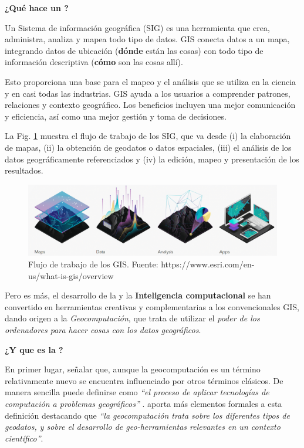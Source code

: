 \documentclass[
]{book}
\theoremstyle{definition}
\theoremstyle{definition}
\theoremstyle{definition}
\theoremstyle{definition}
\theoremstyle{remark}
\begin{document}
\textbf{¿Qué hace un ?}

Un Sistema de información geográfica (SIG) es una herramienta que crea,
administra, analiza y mapea todo tipo de datos. GIS conecta datos a un mapa,
integrando datos de ubicación (\textbf{dónde} están las cosas) con todo tipo de
información descriptiva (\textbf{cómo} son las cosas allí).

Esto proporciona una base para el mapeo y el análisis que se utiliza en la
ciencia y en casi todas las industrias. GIS ayuda a los usuarios a comprender
patrones, relaciones y contexto geográfico. Los beneficios incluyen una mejor
comunicación y eficiencia, así como una mejor gestión y toma de decisiones.

La Fig. \ref{fig:gisflujo} muestra el flujo de trabajo de los SIG, que va desde
(i) la elaboración de mapas, (ii) la obtención de geodatos o datos espaciales,
(iii) el análisis de los datos geográficamente referenciados y (iv) la edición,
mapeo y presentación de los resultados.

\begin{figure}

{\centering \includegraphics[width=0.7\linewidth]{img/GIS} 

}

\caption{Flujo de trabajo de los GIS. Fuente: https://www.esri.com/en-us/what-is-gis/overview}\label{fig:gisflujo}
\end{figure}

Pero es más, el desarrollo de la  y la \textbf{Inteligencia
computacional} se han convertido en herramientas creativas y complementarias a
los convencionales GIS, dando origen a la \emph{Geocomputación}, que trata de
utilizar el \emph{poder de los ordenadores para hacer cosas con los datos
geográficos}.

\textbf{¿Y que es la ?}

En primer lugar, señalar que, aunque la geocomputación es un término
relativamente nuevo se encuentra influenciado por otros términos clásicos. De
manera sencilla puede definirse como \emph{``el proceso de aplicar tecnologías de
computación a problemas geográficos''} \citep{rees1998}. \citet{Openshaw_Abrahart_2000}
aporta más elementos formales a esta definición destacando que \emph{``la
geocomputación trata sobre los diferentes tipos de geodatos, y sobre el
desarrollo de geo-herramientas relevantes en un contexto científico''}.
\end{document}

